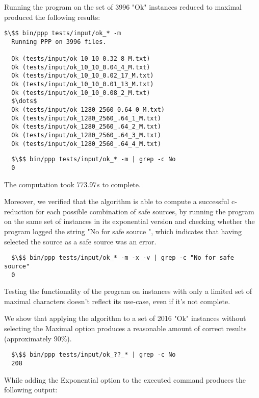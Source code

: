 Running the program on the set of 3996 "Ok" instances reduced to maximal produced the following results:

\lstset{style=code_block}

\begin{lstlisting}[belowskip=0pt]
  $\$$ bin/ppp tests/input/ok_* -m
  Running PPP on 3996 files.

  Ok (tests/input/ok_10_10_0.32_8_M.txt)
  Ok (tests/input/ok_10_10_0.04_4_M.txt)
  Ok (tests/input/ok_10_10_0.02_17_M.txt)
  Ok (tests/input/ok_10_10_0.01_13_M.txt)
  Ok (tests/input/ok_10_10_0.08_2_M.txt)
  $\dots$
  Ok (tests/input/ok_1280_2560_0.64_0_M.txt)
  Ok (tests/input/ok_1280_2560_.64_1_M.txt)
  Ok (tests/input/ok_1280_2560_.64_2_M.txt)
  Ok (tests/input/ok_1280_2560_.64_3_M.txt)
  Ok (tests/input/ok_1280_2560_.64_4_M.txt)
\end{lstlisting}

\begin{lstlisting}
  $\$$ bin/ppp tests/input/ok_* -m | grep -c No
  0
\end{lstlisting}

The computation took $773.97s$ to complete.

Moreover, we verified that the algorithm is able to compute a successful c-reduction for each possible combination of safe sources, by running the program on the same set of instances in its exponential version and checking whether the program logged the string "No for safe source \species{}", which indicates that having selected the source \species{} as a safe source was an error.

\begin{lstlisting}
  $\$$ bin/ppp tests/input/ok_* -m -x -v | grep -c "No for safe source"
  0
\end{lstlisting}

Testing the functionality of the program on instances with only a limited set of maximal characters doesn't reflect its use-case, even if it's not complete.

We show that applying the algorithm to a set of 2016 "Ok" instances without selecting the Maximal option produces a reasonable amount of correct results (approximately 90\%).

\begin{lstlisting}
  $\$$ bin/ppp tests/input/ok_??_* | grep -c No
  208
\end{lstlisting}

While adding the Exponential option to the executed command produces the following output:

